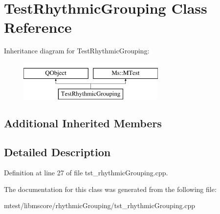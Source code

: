 \hypertarget{class_test_rhythmic_grouping}{}\section{Test\+Rhythmic\+Grouping Class Reference}
\label{class_test_rhythmic_grouping}
Inheritance diagram for Test\+Rhythmic\+Grouping\+:\begin{figure}[H]
\begin{center}
\leavevmode
\includegraphics[height=2.000000cm]{class_test_rhythmic_grouping}
\end{center}
\end{figure}
\subsection*{Additional Inherited Members}


\subsection{Detailed Description}


Definition at line 27 of file tst\+\_\+rhythmic\+Grouping.\+cpp.



The documentation for this class was generated from the following file\+:\begin{DoxyCompactItemize}
\item 
mtest/libmscore/rhythmic\+Grouping/tst\+\_\+rhythmic\+Grouping.\+cpp\end{DoxyCompactItemize}

